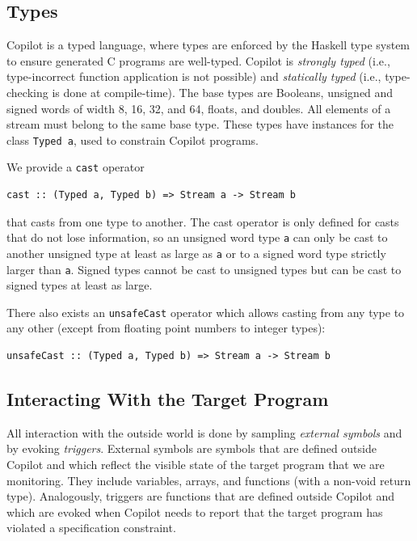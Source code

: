\subsection{Types} \label{sec:types}

Copilot is a typed language, where types are enforced by the Haskell type system
to ensure generated C programs are well-typed.  Copilot is \emph{strongly typed}
(i.e., type-incorrect function application is not possible) and \emph{statically
  typed} (i.e., type-checking is done at compile-time).  The base types are
Booleans, unsigned and signed words of width 8, 16, 32, and 64, floats, and
doubles.  All elements of a stream must belong to the same base
type.  These types have instances for the class {\tt Typed a}, used to constrain
Copilot programs.

We provide a {\tt cast} operator
%
\begin{lstlisting}[language = Copilot, frame = single]
cast :: (Typed a, Typed b) => Stream a -> Stream b  
\end{lstlisting}
%
that casts from one type to another.  The cast operator is only defined for
casts that do not lose information, so an unsigned word type {\tt a} can only be
cast to another unsigned  type at least as large as {\tt a} or to a signed word
type strictly larger than {\tt a}.  Signed types cannot be cast to unsigned
types but can be cast to signed types at least as large.

There also exists an {\tt unsafeCast} operator which allows casting from any
type to any other (except from floating point numbers to integer types):

\begin{lstlisting}[language = Copilot, frame = single]
unsafeCast :: (Typed a, Typed b) => Stream a -> Stream b  
\end{lstlisting}

\subsection{Interacting With the Target Program}
\label{sec:interacting}

All interaction with the outside world is done by sampling \emph{external
  symbols} and by evoking \emph{triggers}.  External symbols are symbols that
are defined outside Copilot and which reflect the visible state of the target
program that we are monitoring.  They include variables, arrays, and functions
(with a non-void return type).  Analogously, triggers are functions that are
defined outside Copilot and which are evoked when Copilot needs to report that
the target program has violated a specification constraint.

